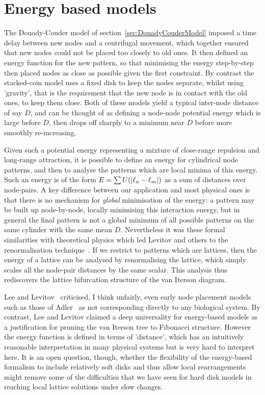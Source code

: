 \section{Energy based models}
\label{sec:energy}
The Douady-Couder model of section~\ref{sec:DouadyCouderModel} imposed a time delay between new nodes and a centrifugal movement, which together ensured that new nodes could not be placed too closely to old ones. It then defined an energy function for the new pattern, so that minimising the energy step-by-step then placed nodes as close as possible given the first constraint.  By contrast the stacked-coin model uses a fixed disk to keep the nodes separate, whilst using 'gravity', that is the requirement that the new node is in contact with the old ones, to keep them close. Both of these models yield  a typical inter-node distance of say $D$, and can be thought of as defining a  node-node potential energy which is large before $D$, then drops off sharply to a minimum near $D$ before more smoothly re-increasing. 

Given such a potential energy representing a mixture of close-range repulsion and long-range attraction, it is possible to define an energy for cylindrical node patterns, and then to analyse the patterns which are local minima of this energy. Such an energy is of the form 
$E=\sum U(\left|\ell_{{n}}-\ell_{{m}}\right|)$ as a sum of distances over node-pairs.  {A key difference between our application and most physical ones is that there is no mechanism for \textit{global} minimisation of the energy: a pattern may be built up node-by-node, locally minimising this interaction energy, but in general the final pattern is not a global minimum of all possible patterns on the same cylinder with the same mean $D$.}
Nevertheless it was these formal similarities with theoretical physics which led Levitov and others to the renormalisation technique~\autocite{levitovFibonacciNumbersBotany1991}. If we restrict to patterns which are lattices, then the energy of a lattice can be analysed by renormalising the lattice, which simply scales all the node-pair distances by the same scalar. This analysis thus rediscovers the  lattice bifurcation structure of the van Iterson diagram.

 Lee and Levitov~\autocite{leeUniversalityPhyllotaxisMechanical1998} criticised, I think unfairly, even early node placement models such as those of Adler~\autocite{adlerConsequencesContactPressure1977} as not corresponding directly to any biological system. By contrast,
 Lee and Levitov claimed a deep universality for energy-based models as a justification for pruning the van Iterson tree to Fibonacci structure. However the energy function is defined in terms of 'distance', which has an intuitively reasonable interpretation in many physical systems but is very hard to interpret here. It is an open question, though, whether the flexibility of the energy-based formalism to include relatively soft disks and thus allow local rearrangements might remove some of the difficulties that we have seen for hard disk models in reaching local lattice solutions under slow changes. 
\newpage

